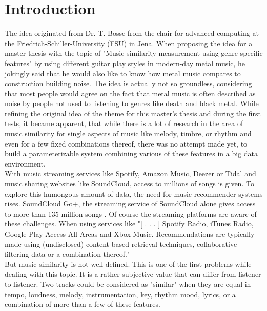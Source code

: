 \chapter{Introduction}\label{intro}

The idea originated from Dr. T. Bosse from the chair for advanced computing at the Friedrich-Schiller-University (FSU) in Jena. When proposing the idea for a master thesis with the topic of "Music similarity measurement using genre-specific features" by using different guitar play styles in modern-day metal music, he jokingly said that he would also like to know how metal music compares to construction building noise. The idea is actually not so groundless, considering that most people would agree on the fact that metal music is often described as noise by people not used to listening to genres like death and black metal.
While refining the original idea of the theme for this master's thesis and during the first tests, it became apparent, that while there is a lot of research in the area of music similarity for single aspects of music like melody, timbre, or rhythm and even for a few fixed combinations thereof, there was no attempt made yet, to build a parameterizable system combining various of these features in a big data environment.\\
With music streaming services like Spotify, Amazon Music, Deezer or Tidal and music sharing websites like SoundCloud, access to millions of songs is given. To explore this humongous amount of data, the need for music recommender systems rises. SoundCloud Go+, the streaming service of SoundCloud alone gives access to more than 135 million songs \cite{soundcloudgo}. 
Of course the streaming platforms are aware of these challenges. When using services like "[ . . . ] Spotify Radio, iTunes Radio, Google Play Access All Areas and Xbox Music. Recommendations are typically made using (undisclosed) content-based retrieval techniques, collaborative filtering data or a combination thereof." \cite[p. 9]{knees1}\\
But music similarity is not well defined. This is one of the first problems while dealing with this topic. It is a rather subjective value that can differ from listener to listener. Two tracks could be considered as "similar" when they are equal in tempo, loudness, melody, instrumentation, key, rhythm mood, lyrics, or a combination of more than a few of these features.\\
\ \\
